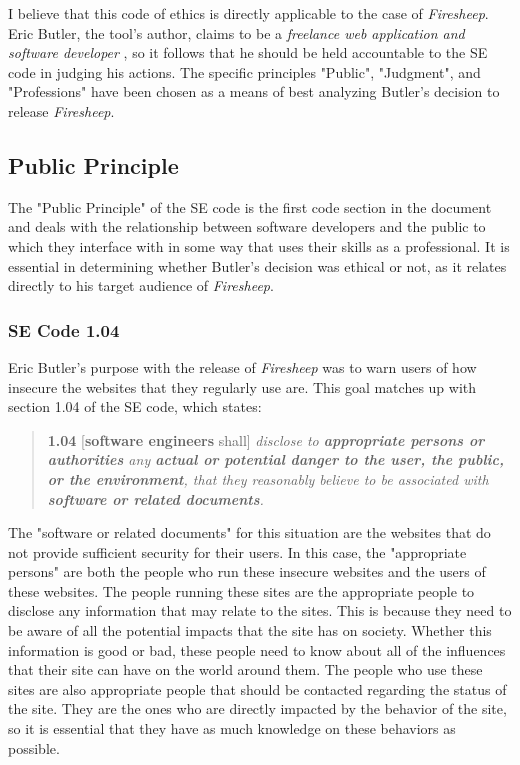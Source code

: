 \documentclass[11pt]{article}
\begin{document}
\begin{multicols}{2}
I believe that this code of ethics is directly applicable to the case of \emph{Firesheep}. Eric Butler, the tool's author, claims to be a \emph{freelance web application and software developer} \cite{codebutler_main}, so it follows that he should be held accountable to the SE code in judging his actions. The specific principles "Public", "Judgment", and "Professions" have been chosen as a means of best analyzing Butler's decision to release \emph{Firesheep}.

\subsection{Public Principle}
The "Public Principle" of the SE code is the first code section in the document and deals with the relationship between software developers and the public to which they interface with in some way that uses their skills as a professional. It is essential in determining whether Butler's decision was ethical or not, as it relates directly to his target audience of \emph{Firesheep}.

\subsubsection{SE Code 1.04}
Eric Butler's purpose with the release of \emph{Firesheep} was to warn users of how insecure the websites that they regularly use are. This goal matches up with section 1.04 of the SE code, which states:

\begin{quote}
  \textbf{1.04} [\textbf{software engineers} shall] \emph{disclose to \textbf{appropriate persons or authorities} any \textbf{actual or potential danger to the user, the public, or the environment}, that they reasonably believe to be associated with \textbf{software or related documents}.} \cite{se_code}
\end{quote}

The "software or related documents" for this situation are the websites that do not provide sufficient security for their users. In this case, the "appropriate persons" are both the people who run these insecure websites and the users of these websites. The people running these sites are the appropriate people to disclose any information that may relate to the sites. This is because they need to be aware of all the potential impacts that the site has on society. Whether this information is good or bad, these people need to know about all of the influences that their site can have on the world around them. The people who use these sites are also appropriate people that should be contacted regarding the status of the site. They are the ones who are directly impacted by the behavior of the site, so it is essential that they have as much knowledge on these behaviors as possible. 


\end{multicols}
\end{document}
